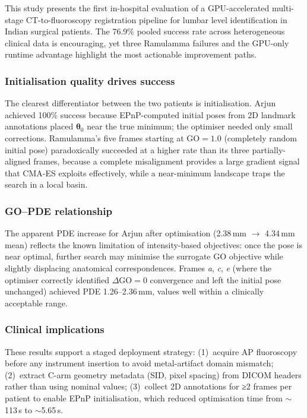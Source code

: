 \documentclass[10pt,a4paper]{article}
\begin{document}
This study presents the first in-hospital evaluation of a
GPU-accelerated multi-stage CT-to-fluoroscopy registration pipeline
for lumbar level identification in Indian surgical patients.
The 76.9\% pooled success rate across heterogeneous clinical data
is encouraging, yet three Ramulamma failures and the GPU-only
runtime advantage highlight the most actionable improvement paths.

\subsubsection*{Initialisation quality drives success}

The clearest differentiator between the two patients is initialisation.
Arjun achieved 100\% success because EPnP-computed initial poses from
2D landmark annotations placed $\boldsymbol{\theta}_0$ near the true
minimum; the optimiser needed only small corrections.
Ramulamma's five frames starting at GO$=1.0$ (completely random
initial pose) paradoxically succeeded at a higher rate than its
three partially-aligned frames, because a complete misalignment
provides a large gradient signal that CMA-ES exploits effectively,
while a near-minimum landscape traps the search in a local basin.

\subsubsection*{GO–PDE relationship}

The apparent PDE increase for Arjun after optimisation (2.38\,mm
$\rightarrow$ 4.34\,mm mean) reflects the known limitation of
intensity-based objectives: once the pose is near optimal, further
search may minimise the surrogate GO objective while slightly
displacing anatomical correspondences.
Frames \textit{a}, \textit{c}, \textit{e} (where the optimiser
correctly identified $\Delta$GO$=0$ convergence and left the initial
pose unchanged) achieved PDE 1.26–2.36\,mm, values well within a
clinically acceptable range.

\subsubsection*{Clinical implications}

These results support a staged deployment strategy:
(1)~acquire AP fluoroscopy before any instrument insertion
    to avoid metal-artifact domain mismatch;
(2)~extract C-arm geometry metadata (SID, pixel spacing) from DICOM
    headers rather than using nominal values;
(3)~collect 2D annotations for ≥2 frames per patient to enable
    EPnP initialisation, which reduced optimisation time from
    $\sim$113\,s to $\sim$5.65\,s.
\end{document}
